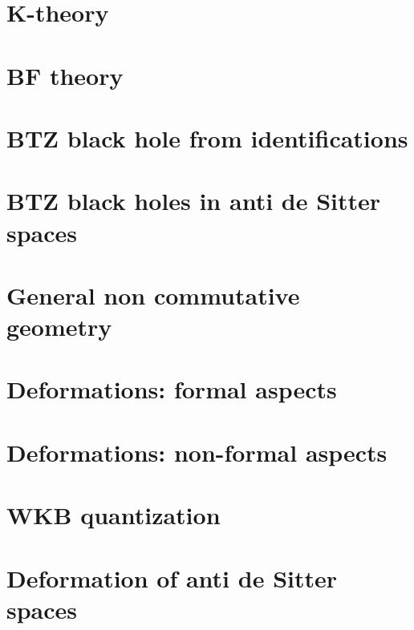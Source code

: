 \chapter{K-theory}


\chapter{BF theory}


\chapter{BTZ black hole from identifications}




\chapter{BTZ black holes in anti de Sitter spaces}                  \label{ChapBHinAdS}
%
%










\chapter{General non commutative geometry}




\chapter{Deformations: formal aspects}          \label{ChapDefo}


\chapter{Deformations: non-formal aspects}


      

\chapter{WKB quantization}


\chapter{Deformation of anti de Sitter spaces}   \label{ChDefoBH}


